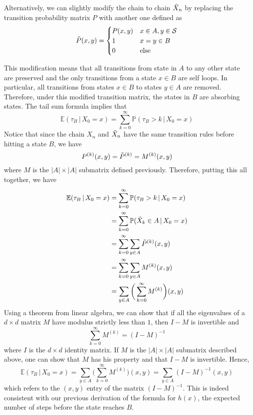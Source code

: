     Alternatively, we can slightly modify the chain to chain $\Tilde{X}_n$ by replacing the transition probability matrix $P$ with another one defined as 
    \begin{equation}
      \Tilde{P}(x, y) = \begin{cases}
      P(x, y) & x \in A, y \in \mathcal{S} \\
      1 & x = y \in B \\
      0 & \text{else}
      \end{cases}
    \end{equation}

    This modification means that all transitions from state in $A$ to any other state are preserved and the only transitions from a state $x \in B$ are self loops. In particular, all transitions from states $x \in B$ to states $y \in A$ are removed. Therefore, under this modified transition matrix, the states in $B$ are absorbing states. The tail sum formula implies that
    \begin{equation}
      \mathbb{E}(\tau_B \,|\, X_0 = x) = \sum_{k=0}^\infty \mathbb{P}(\tau_B > k \,|\, X_0 = x)
    \end{equation}
    Notice that since the chain $X_n$ and $\Tilde{X}_n$ have the same transition rules before hitting a state $B$, we have 
    \begin{equation}
      P^{(k)} (x, y) = \Tilde{P}^{(k)} = M^{(k)}(x, y)
    \end{equation}
    where $M$ is the $|A| \times |A|$ submatrix defined previously. Therefore, putting this all together, we have
    \begin{align*}
      \mathbb{E}(\tau_B \,|\, X_0 = x) & = \sum_{k=0}^\infty \mathbb{P}(\tau_B > k \,|\, X_0 = x) \\
      & = \sum_{k=0}^\infty \mathbb{P}(\Tilde{X}_k \in A \,|\, X_0 = x) \\
      & = \sum_{k=0}^\infty \sum_{y \in A} \Tilde{P}^{(k)} (x, y) \\
      & = \sum_{k=0}^\infty \sum_{y \in A} M^{(k)} (x, y) \\
      & = \sum_{y \in A} \bigg( \sum_{k=0}^\infty M^{(k)} \bigg) (x, y) 
    \end{align*}
    Using a theorem from linear algebra, we can show that if all the eigenvalues of a $d \times d$ matrix $M$ have modulus strictly less than $1$, then $I-M$ is invertible and
    \begin{equation}
      \sum_{k=0}^\infty M^{(k)} = (I - M)^{-1}
    \end{equation}
    where $I$ is the $d \times d$ identity matrix. If $M$ is the $|A| \times |A|$ submatrix described above, one can show that $M$ has his property and that $I - M$ is invertible. Hence, 
    \begin{equation}
      \mathbb{E}(\tau_B \,|\, X_0 = x) = \sum_{y \in A} \bigg( \sum_{k=0}^\infty M^{(k)} \bigg) (x, y) = \sum_{y \in A} (I-M)^{-1} (x, y)
    \end{equation}
    which refers to the $(x, y)$ entry of the matrix $(I - M)^{-1}$. This is indeed consistent with our previous derivation of the formula for $h(x)$, the expected number of steps before the state reaches $B$. 

